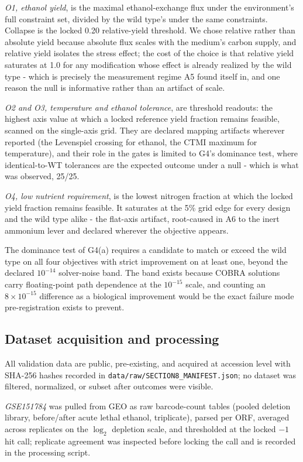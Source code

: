 \documentclass[12pt]{article}
\begin{document}
\emph{O1, ethanol yield}, is the maximal ethanol-exchange flux under
the environment's full constraint set, divided by the wild type's
under the same constraints. Collapse is the locked 0.20 relative-yield
threshold. We chose relative rather than absolute yield because
absolute flux scales with the medium's carbon supply, and relative
yield isolates the stress effect; the cost of the choice is that
relative yield saturates at 1.0 for any modification whose effect is
already realized by the wild type - which is precisely the
measurement regime A5 found itself in, and one reason the null is
informative rather than an artifact of scale.

\emph{O2 and O3, temperature and ethanol tolerance}, are threshold
readouts: the highest axis value at which a locked reference yield
fraction remains feasible, scanned on the single-axis grid. They are
declared mapping artifacts wherever reported (the Levenspiel crossing
for ethanol, the CTMI maximum for temperature), and their role in the
gates is limited to G4's dominance test, where identical-to-WT
tolerances are the expected outcome under a null - which is what was
observed, 25/25.

\emph{O4, low nutrient requirement}, is the lowest nitrogen fraction
at which the locked yield fraction remains feasible. It saturates at
the 5\% grid edge for every design and the wild type alike - the
flat-axis artifact, root-caused in A6 to the inert ammonium lever and
declared wherever the objective appears.

The dominance test of G4(a) requires a candidate to match or exceed
the wild type on all four objectives with strict improvement on at
least one, beyond the declared $10^{-14}$ solver-noise band. The band
exists because COBRA solutions carry floating-point path dependence
at the $10^{-15}$ scale, and counting an $8\times10^{-15}$ difference
as a biological improvement would be the exact failure mode
pre-registration exists to prevent.

\subsection{Dataset acquisition and processing}
\label{sec:acquisition}

All validation data are public, pre-existing, and acquired at
accession level with SHA-256 hashes recorded in
\texttt{data/raw/SECTION8\_MANIFEST.json}; no dataset was filtered,
normalized, or subset after outcomes were visible.

\emph{GSE151784} was pulled from GEO as raw barcode-count tables
(pooled deletion library, before/after acute lethal ethanol,
triplicate), parsed per ORF, averaged across replicates on the
$\log_2$ depletion scale, and thresholded at the locked $-1$ hit
call; replicate agreement was inspected before locking the call and
is recorded in the processing script.
\end{document}
